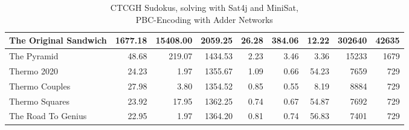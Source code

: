 \begin{table}[t]
{\begin{tabular}{ |l|r|r|r|r|r|r|r|r|}
    \hline
    The Original Sandwich   &   1677.18    &    15408.00  &       2059.25    &    26.28    &   384.06    &       12.22     & 302640 & 42635\\
    \hline
    The Pyramid             &    48.68     &    219.07    &         1434.53  &    2.23      &    3.46    &         3.36     &15233& 1679\\
    \hline
    Thermo 2020             &  24.23       &     1.97    &         1355.67  &   1.09       &      0.66   &       54.23      & 7659 & 729\\
    \hline
    Thermo Couples          &  27.98       &    3.80      &          1354.52 &     0.85   &     0.55     &        8.19      & 8884 & 729\\
    \hline
    Thermo Squares          & 23.92        &    17.95     &        1362.25   &    0.74      &      0.67    &          54.87   & 7692 & 729\\
    \hline
    The Road To Genius      &   22.95       &    1.97      &      1364.20     &    0.81    &     0.74     &          56.83   &  7401 & 729\\
    \hline
    \end{tabular}
    }
    \renewcommand{\arraystretch}{1}
    
    \captionsetup{justification=centering,margin=2cm}
    \caption{CTCGH Sudokus, solving with Sat4j and MiniSat, \\PBC-Encoding with Adder Networks}
    
    \label{Experimnet:CTCGH}
\end{table}



